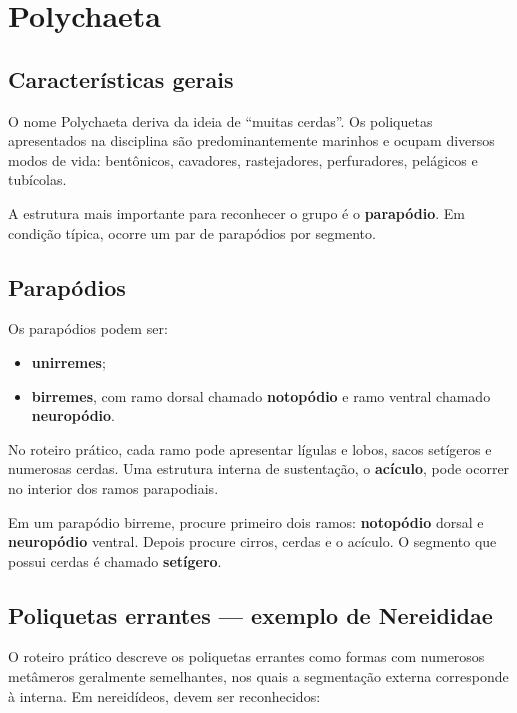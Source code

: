 \documentclass[a4paper,12pt]{article}
\newcommand{\termo}[1]{\textbf{#1}}
\begin{document}
\section{Polychaeta}

\subsection{Características gerais}

O nome Polychaeta deriva da ideia de ``muitas cerdas''. Os poliquetas apresentados na disciplina são predominantemente marinhos e ocupam diversos modos de vida: bentônicos, cavadores, rastejadores, perfuradores, pelágicos e tubícolas.

A estrutura mais importante para reconhecer o grupo é o \termo{parapódio}. Em condição típica, ocorre um par de parapódios por segmento.

\subsection{Parapódios}

Os parapódios podem ser:

\begin{itemize}
  \item \termo{unirremes};
  \item \termo{birremes}, com ramo dorsal chamado \termo{notopódio} e ramo ventral chamado \termo{neuropódio}.
\end{itemize}

No roteiro prático, cada ramo pode apresentar lígulas e lobos, sacos setígeros e numerosas cerdas. Uma estrutura interna de sustentação, o \termo{acículo}, pode ocorrer no interior dos ramos parapodiais.

\begin{pratica}
Em um parapódio birreme, procure primeiro dois ramos: \textbf{notopódio} dorsal e \textbf{neuropódio} ventral. Depois procure cirros, cerdas e o acículo. O segmento que possui cerdas é chamado \textbf{setígero}.
\end{pratica}

\subsection{Poliquetas errantes — exemplo de Nereididae}

O roteiro prático descreve os poliquetas errantes como formas com numerosos metâmeros geralmente semelhantes, nos quais a segmentação externa corresponde à interna. Em nereidídeos, devem ser reconhecidos:
\end{document}
